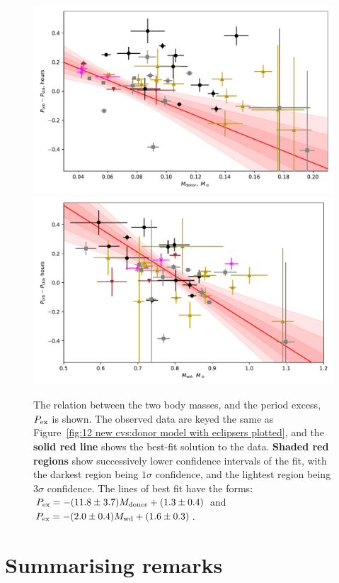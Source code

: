 \begin{figure}
    \centering
    \includegraphics[width=\columnwidth]{figures/results/Mdot/Period_excess_Mr.pdf}
    \includegraphics[width=\columnwidth]{figures/results/Mdot/Period_excess_Mwd.pdf}
    \caption{The relation between the two body masses, and the period excess, $P_{\rm ex}$ is shown. The observed data are keyed the same as Figure~\ref{fig:12 new cvs:donor model with eclipsers plotted}, and the {\bf solid red line} shows the best-fit solution to the data. {\bf Shaded red regions} show successively lower confidence intervals of the fit, with the darkest region being $1\sigma$ confidence, and the lightest region being $3\sigma$ confidence. The lines of best fit have the forms: $P_{\rm ex} = -(11.8\pm3.7) M_{\rm donor} + (1.3\pm0.4)$ and $P_{\rm ex} = -(2.0\pm0.4) M_{\rm wd} + (1.6\pm0.3)$.}
    \label{fig:period excess}
\end{figure}


\section{Summarising remarks}